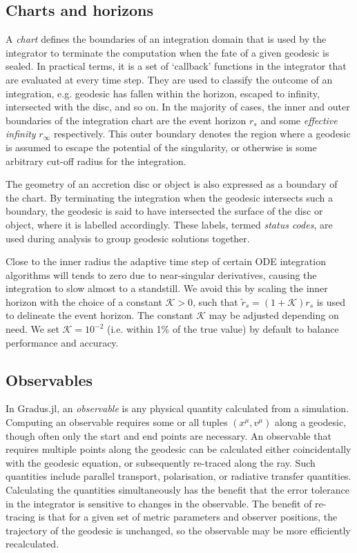 \documentclass[fleqn,usenatbib]{mnras}
\newcommand{\software}[1]{{\sc #1}}
\newcommand{\Gradus}{\software{Gradus.jl}\xspace}
\begin{document}
\subsection{Charts and horizons}

A \emph{chart} defines the boundaries of an integration domain that is used by
the integrator to terminate the computation when the fate of a given geodesic is
sealed. In practical terms, it is a set of `callback' functions in the
integrator that are evaluated at every time step. They are used to classify the
outcome of an integration, e.g. geodesic has fallen within the horizon, escaped
to infinity, intersected with the disc, and so on. In the majority of cases, the
inner and outer boundaries of the integration chart are the event horizon $r_s$
and some \emph{effective infinity} $r_\infty$ respectively. This outer boundary
denotes the region where a geodesic is assumed to escape the potential of the
singularity, or otherwise is some arbitrary cut-off radius for the integration.

The geometry of an accretion disc or object is also expressed as a boundary of
the chart. By terminating the integration when the geodesic intersects such a
boundary, the geodesic is said to have intersected the surface of the disc or
object, where it is labelled accordingly. These labels, termed \emph{status
codes}, are used during analysis to group geodesic solutions together.

Close to the inner radius the adaptive time step of certain ODE integration
algorithms will tends to zero due to near-singular derivatives, causing the
integration to slow almost to a standstill. We avoid this by scaling the inner
horizon with the choice of a constant $\mathcal{K} > 0$, such that $\tilde{r}_s
= (1 + \mathcal{K}) r_s$ is used to delineate the event horizon.  The constant
$\mathcal{K}$ may be adjusted depending on need. We set $\mathcal{K} = 10^{-2}$
(i.e. within 1\% of the true value) by default to balance performance and
accuracy.

\subsection{Observables}
\label{sec:computing-observables}

In \Gradus, an \textit{observable} is any physical quantity calculated from a
simulation. Computing an observable requires some or all tuples $(x^\mu, v^\mu)$
along a geodesic, though often only the start and end points are necessary. An
observable that requires multiple points along the geodesic can be calculated
either coincidentally with the geodesic equation, or subsequently re-traced
along the ray. Such quantities include parallel transport, polarisation, or
radiative transfer quantities.  Calculating the quantities simultaneously has
the benefit that the error tolerance in the integrator is sensitive to changes
in the observable. The benefit of re-tracing is that for a given set of metric
parameters and observer positions, the trajectory of the geodesic is unchanged,
so the observable may be more efficiently recalculated.
\end{document}
